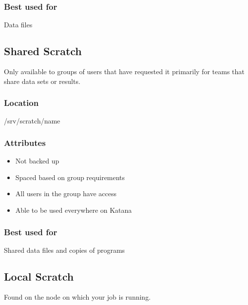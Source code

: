 \documentclass[letterpaper,10pt,english]{sphinxmanual}
\begin{document}
\subsubsection{Best used for}
\label{\detokenize{storage/storage_locations:id4}}
Data files


\subsection{Shared Scratch}
\label{\detokenize{storage/storage_locations:shared-scratch}}
Only available to groups of users that have requested it \sphinxhyphen{} primarily for teams that share data sets or results.


\subsubsection{Location}
\label{\detokenize{storage/storage_locations:id5}}
\begin{sphinxVerbatim}[commandchars=\\\{\}]
/srv/scratch/name
\end{sphinxVerbatim}


\subsubsection{Attributes}
\label{\detokenize{storage/storage_locations:id6}}\begin{itemize}
\item {} 
Not backed up

\item {} 
Spaced based on group requirements

\item {} 
All users in the group have access

\item {} 
Able to be used everywhere on Katana

\end{itemize}


\subsubsection{Best used for}
\label{\detokenize{storage/storage_locations:id7}}
Shared data files and copies of programs


\subsection{Local Scratch}
\label{\detokenize{storage/storage_locations:local-scratch}}
Found on the node on which your job is running.
\end{document}
